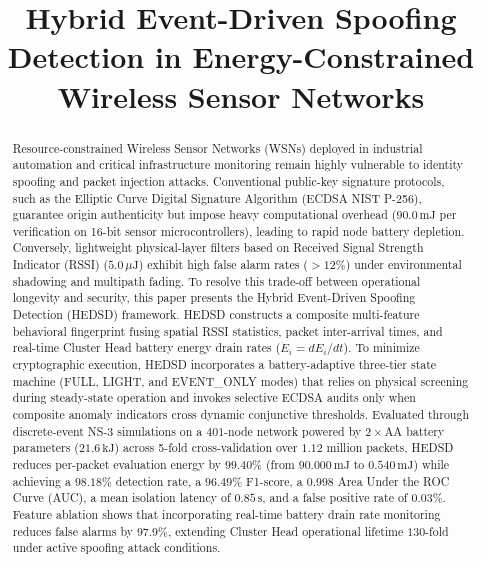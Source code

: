 \documentclass[conference]{IEEEtran}
\begin{document}
\title{Hybrid Event-Driven Spoofing Detection in Energy-Constrained Wireless Sensor Networks}

\author{
}
\maketitle

\begin{abstract}
Resource-constrained Wireless Sensor Networks (WSNs) deployed in industrial automation and critical infrastructure monitoring remain highly vulnerable to identity spoofing and packet injection attacks. Conventional public-key signature protocols, such as the Elliptic Curve Digital Signature Algorithm (ECDSA NIST P-256), guarantee origin authenticity but impose heavy computational overhead ($90.0\,\text{mJ}$ per verification on 16-bit sensor microcontrollers), leading to rapid node battery depletion. Conversely, lightweight physical-layer filters based on Received Signal Strength Indicator (RSSI) ($5.0\,\mu\text{J}$) exhibit high false alarm rates ($>12\%$) under environmental shadowing and multipath fading. To resolve this trade-off between operational longevity and security, this paper presents the Hybrid Event-Driven Spoofing Detection (HEDSD) framework. HEDSD constructs a composite multi-feature behavioral fingerprint fusing spatial RSSI statistics, packet inter-arrival times, and real-time Cluster Head battery energy drain rates ($\dot{E}_i = dE_i/dt$). To minimize cryptographic execution, HEDSD incorporates a battery-adaptive three-tier state machine (FULL, LIGHT, and EVENT\_ONLY modes) that relies on physical screening during steady-state operation and invokes selective ECDSA audits only when composite anomaly indicators cross dynamic conjunctive thresholds. Evaluated through discrete-event NS-3 simulations on a $401$-node network powered by $2 \times \text{AA}$ battery parameters ($21.6\,\text{kJ}$) across 5-fold cross-validation over $1.12$ million packets, HEDSD reduces per-packet evaluation energy by $99.40\%$ (from $90.000\,\text{mJ}$ to $0.540\,\text{mJ}$) while achieving a $98.18\%$ detection rate, a $96.49\%$ F1-score, a $0.998$ Area Under the ROC Curve (AUC), a mean isolation latency of $0.85\,\text{s}$, and a false positive rate of $0.03\%$. Feature ablation shows that incorporating real-time battery drain rate monitoring reduces false alarms by $97.9\%$, extending Cluster Head operational lifetime $130$-fold under active spoofing attack conditions.
\end{abstract}
\end{document}
